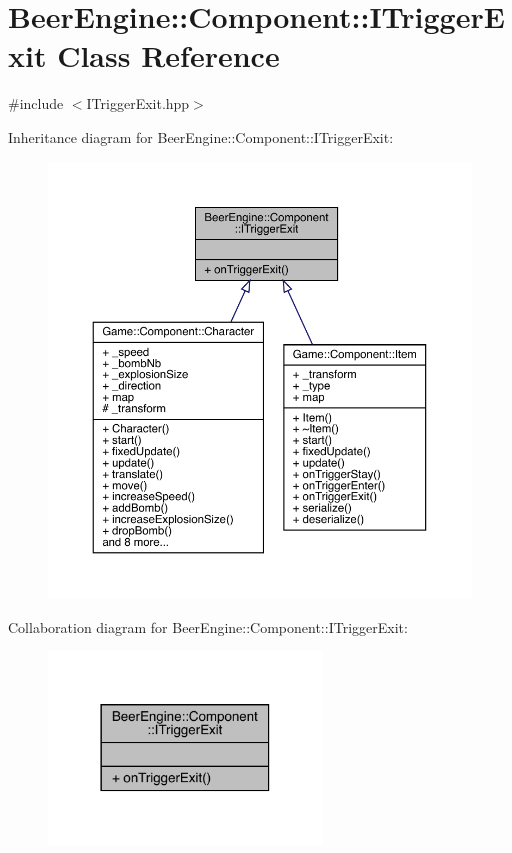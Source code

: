 \hypertarget{class_beer_engine_1_1_component_1_1_i_trigger_exit}{}\section{Beer\+Engine\+:\+:Component\+:\+:I\+Trigger\+Exit Class Reference}
\label{class_beer_engine_1_1_component_1_1_i_trigger_exit}


{\ttfamily \#include $<$I\+Trigger\+Exit.\+hpp$>$}



Inheritance diagram for Beer\+Engine\+:\+:Component\+:\+:I\+Trigger\+Exit\+:\nopagebreak
\begin{figure}[H]
\begin{center}
\leavevmode
\includegraphics[width=350pt]{class_beer_engine_1_1_component_1_1_i_trigger_exit__inherit__graph}
\end{center}
\end{figure}


Collaboration diagram for Beer\+Engine\+:\+:Component\+:\+:I\+Trigger\+Exit\+:\nopagebreak
\begin{figure}[H]
\begin{center}
\leavevmode
\includegraphics[width=206pt]{class_beer_engine_1_1_component_1_1_i_trigger_exit__coll__graph}
\end{center}
\end{figure}
